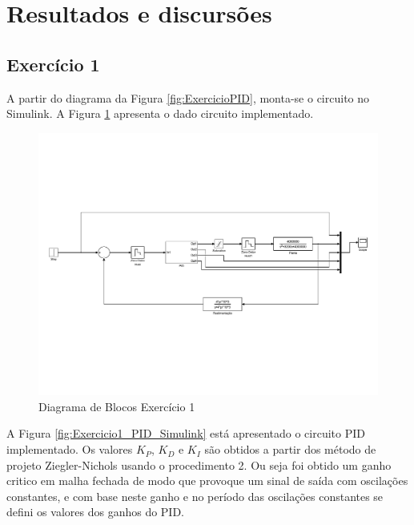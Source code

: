 \section{Resultados e discursões}

\subsection{Exercício 1}
	A partir do diagrama da Figura \ref{fig:ExercicioPID}, monta-se o circuito no Simulink\textregistered. A Figura \ref{fig:Exercicio1_PID_SimulinkII} apresenta o dado circuito implementado.

	\begin{figure}[H]
		\centering
		\includegraphics[scale = .6]{Imagens/Exercicio1_PID_SimulinkII.pdf}
		\caption{Diagrama de Blocos Exercício 1}
		\label{fig:Exercicio1_PID_SimulinkII}
	\end{figure}
	
	 A Figura \ref{fig:Exercicio1_PID_Simulink} está apresentado o circuito PID implementado. Os valores $K_P$, $K_D$ e $K_I$ são obtidos a partir dos método de projeto Ziegler-Nichols usando o procedimento 2. Ou seja foi obtido um ganho critico em malha fechada de modo que provoque um sinal de saída com oscilações constantes, e com base neste ganho e no período das oscilações constantes se defini os valores dos ganhos do PID.
	
